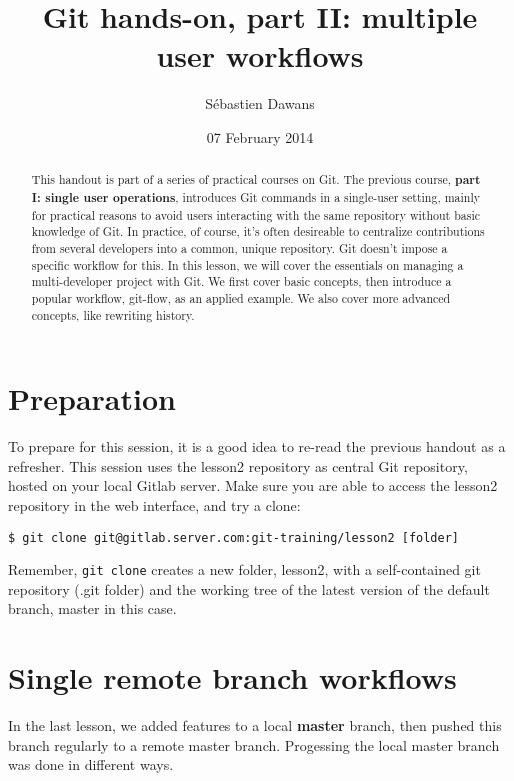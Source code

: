 \documentclass{../common/tufte-latex/tufte-handout}
\title{Git hands-on, part II: multiple user workflows}
\author{S\'ebastien Dawans}
\date{07 February 2014} %
\begin{document}
\maketitle%

\begin{abstract}
\noindent
This handout is part of a series of practical courses on Git.
The previous course, \textbf{part I: single user operations}, introduces Git commands in a single-user setting, mainly for practical reasons to avoid users interacting with the same repository without basic knowledge of Git.
In practice, of course, it's often desireable to centralize contributions from several developers into a common, unique repository.
Git doesn't impose a specific workflow for this. 
In this lesson, we will cover the essentials on managing a multi-developer project with Git.
We first cover basic concepts, then introduce a popular workflow, git-flow, as an applied example.
We also cover more advanced concepts, like rewriting history.
\end{abstract}

\section{Preparation}

To prepare for this session, it is a good idea to re-read the previous handout as a refresher.
This session uses the lesson2 repository as central Git repository, hosted on your local Gitlab server.
Make sure you are able to access the lesson2 repository in the web interface, and try a clone:

\begin{lstlisting}[style=BashInputStyle]
  $ git clone git@gitlab.server.com:git-training/lesson2 [folder]
\end{lstlisting}

Remember, \texttt{git clone} creates a new folder, lesson2, with a self-contained git repository (.git folder) and the working tree of the latest version of the default branch, master in this case.

\section{Single remote branch workflows}

In the last lesson, we added features to a local \textbf{master} branch, then pushed this branch regularly to a remote master branch.
Progessing the local master branch was done in different ways.
\end{document}

